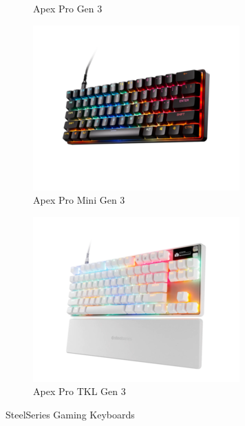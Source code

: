 \documentclass[a4paper,12pt]{report}
\begin{document}
\begin{itemize}
\begin{figure}[h!]
\begin{subfigure}[b]{0.25\textwidth}
        \caption{Apex Pro Gen 3}
    \end{subfigure}
    \hfill
    \begin{subfigure}[b]{0.25\textwidth}
        \includegraphics[width=\textwidth]{ressources/kb_2.png}
        \caption{Apex Pro Mini Gen 3}
    \end{subfigure}
    \hfill
    \begin{subfigure}[b]{0.25\textwidth}
        \includegraphics[width=\textwidth]{ressources/kb_3.png}
        \caption{Apex Pro TKL Gen 3}
    \end{subfigure}
    \caption{SteelSeries Gaming Keyboards}

\end{figure}
\end{itemize}
\end{document}
